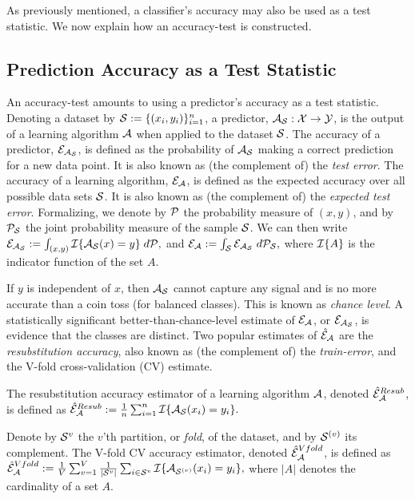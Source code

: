 \documentclass[oupdraft]{bio}
\begin{document}
As previously mentioned, a classifier's accuracy may also be used as a test statistic. 
We now explain how an accuracy-test is constructed. 


\subsection{Prediction Accuracy as a Test Statistic}
An accuracy-test amounts to using a predictor's accuracy as a test statistic.  
Denoting a dataset by $\mathcal{S}:=\{(x_i,y_i)\}_{i=1}^n$, a predictor, $\mathcal{A}_{\mathcal{S}}:\mathcal{X} \to \mathcal{Y}$, is the output of a learning algorithm $\mathcal{A}$ when applied to the dataset $\mathcal{S}$. 
The accuracy of a predictor, $\mathcal{E}_{\mathcal{A}_{\mathcal{S}}}$, is defined as the probability of $\mathcal{A}_{\mathcal{S}}$ making a correct prediction for a new data point. 
It is also known as (the complement of) the \emph{test error}.
The accuracy of a learning algorithm, $\mathcal{E}_{\mathcal{A}}$, is defined as the expected accuracy over all possible data sets $\mathcal{S}$. 
It is also known as (the complement of) the \emph{expected test error}.
Formalizing, we denote by $\mathcal{P}$ the probability measure of $(x, y)$, and by $\mathcal{P}_{\mathcal{S}}$ the joint probability measure of the sample $\mathcal{S}$. 
We can then write $\mathcal{E}_{\mathcal{A}_{\mathcal{S}}}:=\int_{(x,y)} \mathcal{I}{\{ \mathcal{A}_{\mathcal{S}}(x)=y \}} \; d\mathcal{P},$
and
$\mathcal{E}_{\mathcal{A}}:=\int_{\mathcal{S}} \mathcal{E}_{\mathcal{A}_{\mathcal{S}}} \; d\mathcal{P}_{\mathcal{S}},$
where $\mathcal{I}{\{ A \}}$ is the indicator function of the set $A$. 

If $y$ is independent of $x$, then $\mathcal{A}_{\mathcal{S}}$ cannot capture any signal and is no more accurate than a coin toss (for balanced classes). 
This is known as \emph{chance level}.
A statistically significant better-than-chance-level estimate of $\mathcal{E}_{\mathcal{A}}$, or $\mathcal{E}_{\mathcal{A}_{\mathcal{S}}}$, is evidence that the classes are distinct. 
Two popular estimates of $\hat{\mathcal{E}}_{\mathcal{A}}$ are the \emph{resubstitution accuracy}, also known as (the complement of) the \emph{train-error}, and the V-fold cross-validation (CV) estimate.
\begin{definition}
	\label{def:resubstitution}
	The resubstitution accuracy estimator of a learning algorithm $\mathcal{A}$, denoted $\hat{\mathcal{E}}_{\mathcal{A}}^{Resub}$,  is defined as
	$\hat{\mathcal{E}}_{\mathcal{A}}^{Resub} := \frac 1n \sum_{i=1}^{n} \mathcal{I}{\{ \mathcal{A}_{\mathcal{S}}(x_i)=y_i \}}.$
\end{definition}


\begin{definition}
	\label{def:v-fold}
	Denote by $\mathcal{S}^{v}$ the $v$'th partition, or \emph{fold}, of the dataset, and by $\mathcal{S}^{(v)}$ its complement.
	The V-fold CV accuracy estimator, denoted $\hat{\mathcal{E}}_{\mathcal{A}}^{Vfold}$, is defined as 	
	$\hat{\mathcal{E}}_{\mathcal{A}}^{Vfold} := 
	\frac 1V \sum_{v=1}^{V} \frac{1}{|\mathcal{S}^v|} \sum_{i \in \mathcal{S}^{v}} \mathcal{I}{\{ \mathcal{A}_{\mathcal{S}^{(v)}}(x_i)=y_i \}},$
	where $|A|$ denotes the cardinality of a set $A$.
\end{definition}
\end{document}
